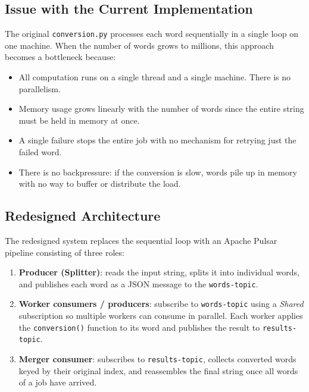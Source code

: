 \documentclass[11pt,a4paper]{article}
\begin{document}
\subsection{Issue with the Current Implementation}

The original \texttt{conversion.py} processes each word sequentially in a single loop on one
machine. When the number of words grows to millions, this approach becomes a bottleneck
because:

\begin{itemize}[leftmargin=1.5cm]
  \item All computation runs on a single thread and a single machine. There is no parallelism.
  \item Memory usage grows linearly with the number of words since the entire string must be
        held in memory at once.
  \item A single failure stops the entire job with no mechanism for retrying just the failed word.
  \item There is no backpressure: if the conversion is slow, words pile up in memory with no
        way to buffer or distribute the load.
\end{itemize}

\subsection{Redesigned Architecture}

The redesigned system replaces the sequential loop with an Apache Pulsar pipeline consisting
of three roles:

\begin{enumerate}[leftmargin=1.5cm]
  \item \textbf{Producer (Splitter)}: reads the input string, splits it into individual words,
        and publishes each word as a JSON message to the \texttt{words-topic}.
  \item \textbf{Worker consumers / producers}: subscribe to \texttt{words-topic} using a
        \textit{Shared} subscription so multiple workers can consume in parallel. Each worker
        applies the \texttt{conversion()} function to its word and publishes the result to
        \texttt{results-topic}.
  \item \textbf{Merger consumer}: subscribes to \texttt{results-topic}, collects converted
        words keyed by their original index, and reassembles the final string once all words of
        a job have arrived.
\end{enumerate}
\end{document}
